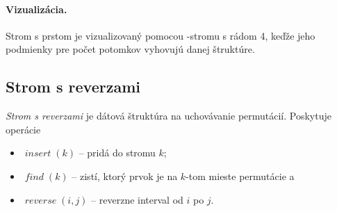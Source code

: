 
\paragraph{Vizualizácia.}
Strom s prstom je vizualizovaný pomocou \Bp-stromu s rádom 4, keďže jeho podmienky pre počet potomkov vyhovujú
danej štruktúre.
\def\find{$\mathop{find}(k)$}

\subsection{Strom s reverzami}
\emph{Strom s reverzami} je dátová štruktúra na uchovávanie permutácií. 
Poskytuje operácie 
\begin{itemize}
\item $\mathop{\mathit{insert}}(k)$ -- pridá do stromu $k$;
\item $\mathop{\mathit{find}}(k)$ -- zistí, ktorý prvok je na $k$-tom mieste permutácie a
\item $\mathop{\mathit{reverse}}(i,j)$ -- reverzne interval od $i$ po $j$.
\end{itemize}

